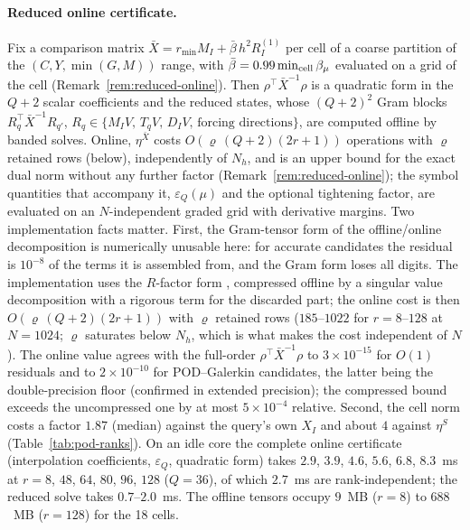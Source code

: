 \documentclass[11pt]{amsart}
\theoremstyle{remark}
\begin{document}
\paragraph{Reduced online certificate.}
Fix a comparison matrix $\bar X=r_{\min}M_I+\bar\beta\,h^2R^{(1)}_I$ per cell of a coarse
partition of the $(C,Y,\min(G,M))$ range, with $\bar\beta=0.99\min_{\rm cell}\beta_\mu$ evaluated on
a grid of the cell (Remark~\ref{rem:reduced-online}).  Then $\rho^\top\bar X^{-1}\rho$ is a quadratic form in the
$Q+2$ scalar coefficients and the reduced states, whose $(Q+2)^2$ Gram blocks
$R_q^\top\bar X^{-1}R_{q'}$, $R_q\in\{M_IV,\,T_qV,\,D_IV,\,\text{forcing directions}\}$, are
computed offline by banded solves.  Online, $\eta^{\bar X}$ costs $O(\varrho\,(Q+2)(2r+1))$ operations
with $\varrho$ retained rows (below), independently of $N_h$, and is an upper bound for the exact dual norm without any further factor
(Remark~\ref{rem:reduced-online}); the symbol quantities that accompany it, $\varepsilon_Q(\mu)$ and
the optional tightening factor, are evaluated on an $N$-independent graded grid with derivative
margins.  Two implementation facts matter.  First, the Gram-tensor form of the offline/online
decomposition is numerically unusable here: for accurate candidates the residual is $10^{-8}$ of
the terms it is assembled from, and the Gram form loses all digits.  The implementation uses the
$R$-factor form \cite{CasenaveErnLelievre2014,BuhrEngwerOhlbergerRave2014}, compressed offline by a
singular value decomposition with a rigorous term for the discarded part; the online cost is then
$O(\varrho\,(Q+2)(2r+1))$ with $\varrho$ retained rows ($185$--$1022$ for $r=8$--$128$ at $N=1024$;
$\varrho$ saturates below $N_h$, which is what makes the cost independent of $N$).  The online
value agrees with the full-order $\rho^\top\bar X^{-1}\rho$ to $3\times10^{-15}$ for $O(1)$ residuals
and to $2\times10^{-10}$ for POD--Galerkin candidates, the latter being the double-precision floor
(confirmed in extended precision); the compressed bound exceeds the uncompressed one by at most
$5\times10^{-4}$ relative.  Second, the cell norm costs a factor $1.87$ (median) against the
query's own $X_I$ and about $4$ against $\eta^S$ (Table~\ref{tab:pod-ranks}).  On an idle core the
complete online certificate (interpolation coefficients, $\varepsilon_Q$, quadratic form) takes
$2.9$, $3.9$, $4.6$, $5.6$, $6.8$, $8.3$~ms at $r=8$, $48$, $64$, $80$, $96$, $128$ ($Q=36$), of which
$2.7$~ms are rank-independent; the reduced solve takes $0.7$--$2.0$~ms.  The offline tensors
occupy $9$~MB ($r=8$) to $688$~MB ($r=128$) for the 18 cells.
\end{document}

